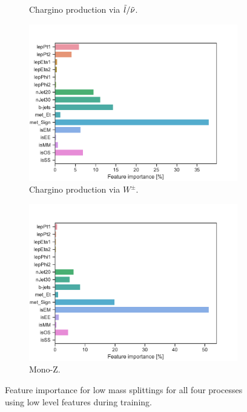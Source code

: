 \begin{figure}[H]
\begin{subfigure}[t!]{0.49\textwidth}
        \caption{Chargino production via $\Tilde{l}/\Tilde{\nu}$.}
        \label{fig:}
    \end{subfigure}
    \begin{subfigure}[t!]{0.49\textwidth}
        \includegraphics[width = \textwidth]{Figures/WW/BDT/Low_level/High/featureImportance.pdf}
        \caption{Chargino production via $W^\pm$.}
        \label{fig:}
    \end{subfigure}
    \begin{subfigure}[t!]{0.49\textwidth}
        \includegraphics[width = \textwidth]{Figures/Mono_Z/ML/BDT/Low_level/High/featureImportance.pdf}
        \caption{Mono-Z.}
        \label{fig:}
    \end{subfigure}
    \caption{Feature importance for low mass splittings for all four processes using low level features during training.}
    \label{fig:Non}
\end{figure}


